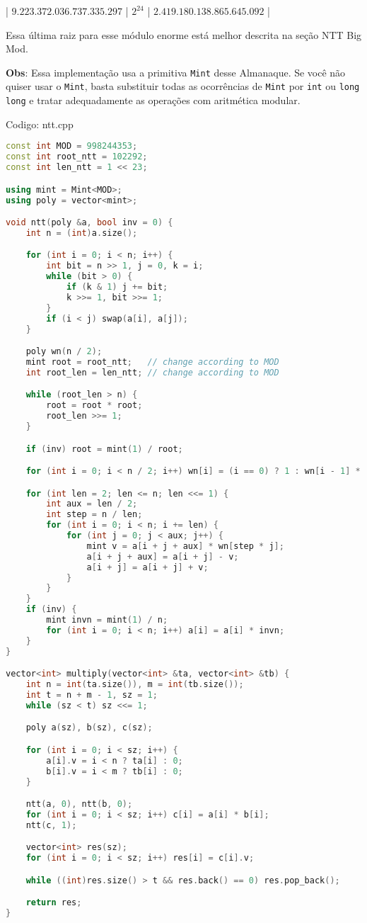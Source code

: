 \documentclass[10pt, a4paper, oneside]{book}
\begin{document}
| $9.223.372.036.737.335.297$ | $2^{24}$ | $2.419.180.138.865.645.092$ |



Essa última raiz para esse módulo enorme está melhor descrita na seção NTT Big Mod.



\textbf{Obs}: Essa implementação usa a primitiva \texttt{Mint} desse Almanaque. Se você não quiser usar o \texttt{Mint}, basta substituir todas as ocorrências de \texttt{Mint} por \texttt{int} ou \texttt{long long} e tratar adequadamente as operações com aritmética modular.
\hfill

Codigo: ntt.cpp

\begin{lstlisting}[language=C++]
const int MOD = 998244353;
const int root_ntt = 102292;
const int len_ntt = 1 << 23;

using mint = Mint<MOD>;
using poly = vector<mint>;

void ntt(poly &a, bool inv = 0) {
    int n = (int)a.size();

    for (int i = 0; i < n; i++) {
        int bit = n >> 1, j = 0, k = i;
        while (bit > 0) {
            if (k & 1) j += bit;
            k >>= 1, bit >>= 1;
        }
        if (i < j) swap(a[i], a[j]);
    }

    poly wn(n / 2);
    mint root = root_ntt;   // change according to MOD
    int root_len = len_ntt; // change according to MOD

    while (root_len > n) {
        root = root * root;
        root_len >>= 1;
    }

    if (inv) root = mint(1) / root;

    for (int i = 0; i < n / 2; i++) wn[i] = (i == 0) ? 1 : wn[i - 1] * root;

    for (int len = 2; len <= n; len <<= 1) {
        int aux = len / 2;
        int step = n / len;
        for (int i = 0; i < n; i += len) {
            for (int j = 0; j < aux; j++) {
                mint v = a[i + j + aux] * wn[step * j];
                a[i + j + aux] = a[i + j] - v;
                a[i + j] = a[i + j] + v;
            }
        }
    }
    if (inv) {
        mint invn = mint(1) / n;
        for (int i = 0; i < n; i++) a[i] = a[i] * invn;
    }
}

vector<int> multiply(vector<int> &ta, vector<int> &tb) {
    int n = int(ta.size()), m = int(tb.size());
    int t = n + m - 1, sz = 1;
    while (sz < t) sz <<= 1;

    poly a(sz), b(sz), c(sz);

    for (int i = 0; i < sz; i++) {
        a[i].v = i < n ? ta[i] : 0;
        b[i].v = i < m ? tb[i] : 0;
    }

    ntt(a, 0), ntt(b, 0);
    for (int i = 0; i < sz; i++) c[i] = a[i] * b[i];
    ntt(c, 1);

    vector<int> res(sz);
    for (int i = 0; i < sz; i++) res[i] = c[i].v;

    while ((int)res.size() > t && res.back() == 0) res.pop_back();

    return res;
}\end{lstlisting}
\hfill
\end{document}

